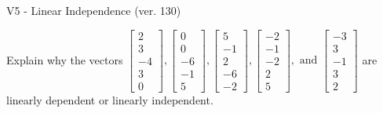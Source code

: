\begin{exercise}
  \begin{exerciseTitle}V5 - Linear Independence (ver. 130)\end{exerciseTitle}
  \begin{exerciseStatement}
    Explain why the vectors \(\left[\begin{array}{r}
2 \\
3 \\
-4 \\
3 \\
0
\end{array}\right] , \left[\begin{array}{r}
0 \\
0 \\
-6 \\
-1 \\
5
\end{array}\right] , \left[\begin{array}{r}
5 \\
-1 \\
2 \\
-6 \\
-2
\end{array}\right] , \left[\begin{array}{r}
-2 \\
-1 \\
-2 \\
2 \\
5
\end{array}\right] , \text{ and } \left[\begin{array}{r}
-3 \\
3 \\
-1 \\
3 \\
2
\end{array}\right]\) are linearly dependent or linearly independent.	



\end{exerciseStatement}
\end{exercise}

